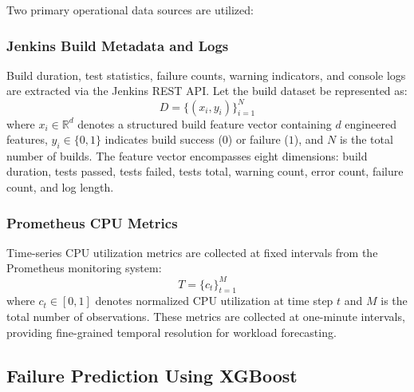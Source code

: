 \documentclass[a4paper,fleqn]{cas-dc}
\begin{document}
Two primary operational data sources are utilized:

\subsubsection{Jenkins Build Metadata and Logs}
Build duration, test statistics, failure counts, warning indicators, and console logs are extracted via the Jenkins REST API.
Let the build dataset be represented as:
\begin{equation}
D = \{(x_i, y_i)\}_{i=1}^{N}
\end{equation}
where $x_i \in \mathbb{R}^d$ denotes a structured build feature vector containing $d$ engineered features, $y_i \in \{0,1\}$ indicates build success ($0$) or failure ($1$), and $N$ is the total number of builds.
The feature vector encompasses eight dimensions: build duration, tests passed, tests failed, tests total, warning count, error count, failure count, and log length.

\subsubsection{Prometheus CPU Metrics}
Time-series CPU utilization metrics are collected at fixed intervals from the Prometheus monitoring system:
\begin{equation}
T = \{c_t\}_{t=1}^{M}
\end{equation}
where $c_t \in [0, 1]$ denotes normalized CPU utilization at time step $t$ and $M$ is the total number of observations.
These metrics are collected at one-minute intervals, providing fine-grained temporal resolution for workload forecasting.

\subsection{Failure Prediction Using XGBoost}\label{subsec:failurepred}
\end{document}
